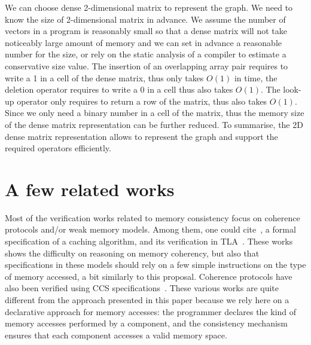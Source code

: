 \documentclass[preprint,12pt]{elsarticle}
\begin{document}
We can choose dense 2-dimensional matrix to represent the graph.
We need to know the size of 2-dimensional matrix in advance.
We assume the number of vectors in a program is reasonably small
so that a dense matrix will not take noticeably large amount of memory
and we can set in advance a reasonable number for the size,
or rely on the static analysis of a compiler to estimate a conservative size value.
The insertion of an overlapping array pair requires to write a 1 in a cell of the dense matrix,
thus only takes $O(1)$ in time, the deletion operator requires to write a 0 in a cell
thus also takes $O(1)$. The look-up operator only requires to return a row of the matrix,
thus also takes $O(1)$. Since we only need a binary number in a cell of the matrix,
thus the memory size of the dense matrix representation can be further reduced.
To summarise, the 2D dense matrix representation allows to represent the graph
and support the required operators efficiently.


%
%


\section{A few related works}\label{sec:RW} 
Most of the verification works related to memory consistency focus on coherence 
protocols 
and/or 
weak memory models. 
Among them, one could cite~\cite{Gerth1999}, a formal specification of a caching 
algorithm, and its verification in TLA~\cite{Ladkin1999}. These works shows the 
difficulty on reasoning on memory coherency, but also that specifications in these models 
should rely on a few simple instructions on the type of memory accessed, a bit similarly 
to this proposal.
Coherence protocols have also been verified using CCS specifications~\cite{Barrio01}. 
These various works are quite different from the approach presented in this paper because 
we rely here on a declarative approach for memory accesses: the programmer declares the 
kind of memory accesses performed by a component, and the consistency mechanism ensures 
that each component accesses a valid memory space.
\end{document}
